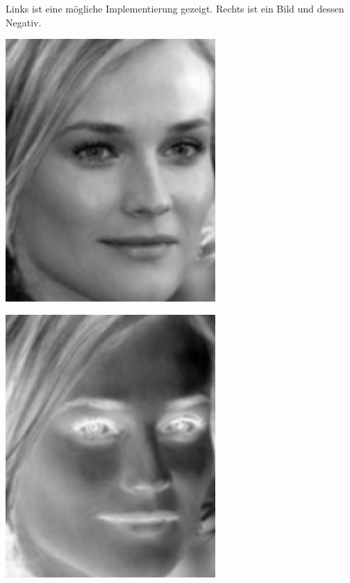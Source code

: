 \begin{losung}
	Links ist eine mögliche Implementierung gezeigt.
	Rechts ist ein Bild und dessen Negativ.\\[0.5cm]
	\begin{minipage}{0.45\textwidth}

	\end{minipage}\hfill
	\begin{minipage}{0.25\textwidth}\vspace{-1cm}
		\centering\includegraphics[width=0.6\textwidth]{images/vectormatrix/Diane_Kruger}
	\end{minipage}
	\begin{minipage}{0.25\textwidth}\vspace{-1cm}
		\centering\includegraphics[width=0.6\textwidth]{images/vectormatrix/Diane_Kruger_negative}
	\end{minipage}
\end{losung}